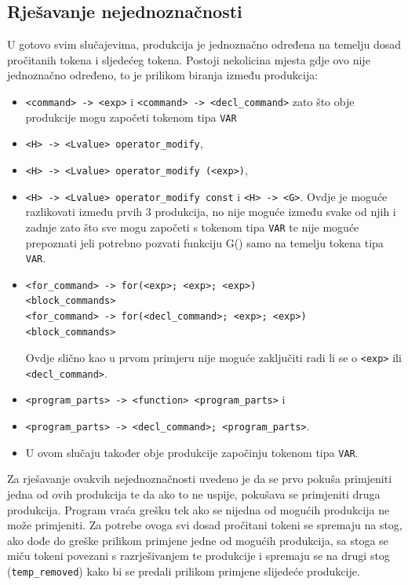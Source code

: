 \documentclass[times, utf8, zavrsni]{fer}
\begin{document}
\subsection{Rješavanje nejednoznačnosti}
U gotovo svim slučajevima, produkcija je jednoznačno određena
na temelju dosad pročitanih tokena i sljedećeg tokena. Postoji nekolicina mjesta gdje ovo nije jednoznačno određeno, to je prilikom biranja između produkcija:
\begin{itemize}
    \item \verb|<command> -> <exp>| i \verb|<command> -> <decl_command>| zato što obje produkcije mogu započeti tokenom tipa \verb|VAR|
    \item \verb|<H> -> <Lvalue> operator_modify|,
    \item[] \verb|<H> -> <Lvalue> operator_modify (<exp>)|, 
    \item[] \verb|<H> -> <Lvalue> operator_modify const| i \verb|<H> -> <G>|. Ovdje je moguće razlikovati između prvih 3 produkcija, 
    no nije moguće između svake od njih i zadnje zato što sve mogu započeti s tokenom tipa \verb|VAR| te nije moguće prepoznati jeli potrebno pozvati funkciju G()
    samo na temelju tokena tipa \verb|VAR|.
    \item \begin{verbatim}
<for_command> -> for(<exp>; <exp>; <exp>)
<block_commands>
<for_command> -> for(<decl_command>; <exp>; <exp>) 
<block_commands>
    \end{verbatim} Ovdje slično kao u prvom primjeru nije moguće zaključiti radi li se o \verb|<exp>| ili \verb|<decl_command>|.
    \item \verb|<program_parts> -> <function> <program_parts>| i
    \item[] \verb|<program_parts> -> <decl_command>; <program_parts>|. 
    \item[] U ovom slučaju također obje produkcije započinju tokenom tipa \verb|VAR|.
\end{itemize}
Za rješavanje ovakvih nejednoznačnosti uvedeno je da se prvo pokuša primjeniti jedna od ovih produkcija te da ako to ne uspije, pokušava se primjeniti druga produkcija.
Program vraća grešku tek ako se nijedna od mogućih produkcija ne može primjeniti. Za potrebe ovoga svi dosad pročitani tokeni se spremaju na stog,
ako dođe do greške prilikom primjene jedne od mogućih produkcija, sa stoga se miču tokeni povezani s razrješivanjem te produkcije i spremaju se na drugi stog (\verb|temp_removed|)
kako bi se predali prilikom primjene slijedeće produkcije.
\end{document}
